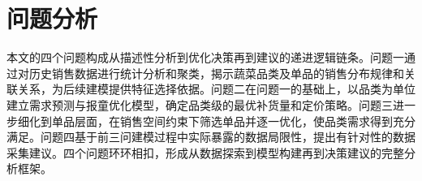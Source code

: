 
\section{问题分析}

本文的四个问题构成从描述性分析到优化决策再到建议的递进逻辑链条。问题一通过对历史销售数据进行统计分析和聚类，揭示蔬菜品类及单品的销售分布规律和关联关系，为后续建模提供特征选择依据。问题二在问题一的基础上，以品类为单位建立需求预测与报童优化模型，确定品类级的最优补货量和定价策略。问题三进一步细化到单品层面，在销售空间约束下筛选单品并逐一优化，使品类需求得到充分满足。问题四基于前三问建模过程中实际暴露的数据局限性，提出有针对性的数据采集建议。四个问题环环相扣，形成从数据探索到模型构建再到决策建议的完整分析框架。
